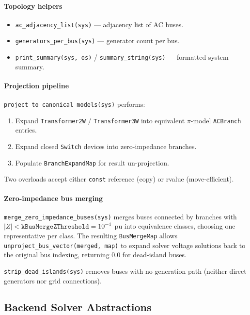 \paragraph{Topology helpers}
\begin{itemize}
  \item \texttt{ac\_adjacency\_list(sys)} --- adjacency list of AC buses.
  \item \texttt{generators\_per\_bus(sys)} --- generator count per bus.
  \item \texttt{print\_summary(sys, os)} / \texttt{summary\_string(sys)} --- formatted system summary.
\end{itemize}

\paragraph{Projection pipeline}

\texttt{project\_to\_canonical\_models(sys)} performs:
\begin{enumerate}
  \item Expand \texttt{Transformer2W} / \texttt{Transformer3W} into equivalent \(\pi\)-model \texttt{ACBranch} entries.
  \item Expand closed \texttt{Switch} devices into zero-impedance branches.
  \item Populate \texttt{BranchExpandMap} for result un-projection.
\end{enumerate}

Two overloads accept either \texttt{const} reference (copy) or rvalue (move-efficient).

\paragraph{Zero-impedance bus merging}

\texttt{merge\_zero\_impedance\_buses(sys)} merges buses connected by branches
with $|Z| < \texttt{kBusMergeZThreshold}=10^{-4}$~pu into equivalence classes,
choosing one representative per class.  The resulting \texttt{BusMergeMap}
allows \texttt{unproject\_bus\_vector(merged, map)} to expand solver voltage
solutions back to the original bus indexing, returning 0.0 for dead-island
buses.

\texttt{strip\_dead\_islands(sys)} removes buses with no generation path
(neither direct generators nor grid connections).

\subsection{Backend Solver Abstractions}
\label{sec:backend}


